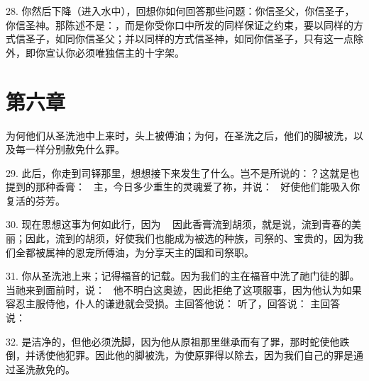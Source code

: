28. 你然后下降（进入水中），回想你如何回答那些问题：你信圣父，你信圣子，你信圣神。那陈述不是：，而是你受你口中所发的同样保证之约束，要以同样的方式信圣子，如同你信圣父；并以同样的方式信圣神，如同你信圣子，只有这一点除外，即你宣认你必须唯独信主的十字架。\par


\section{第六章}

为何他们从圣洗池中上来时，头上被傅油；为何，在圣洗之后，他们的脚被洗，以及每一样分别赦免什么罪。\par

29. 此后，你走到司铎那里，想想接下来发生了什么。岂不是所说的：？这就是也提到的那种香膏：~ 主，今日多少重生的灵魂爱了祢，并说：~ 好使他们能吸入你复活的芬芳。\par

30. 现在思想这事为何如此行，因为 ~ 因此香膏流到胡须，就是说，流到青春的美丽；因此，流到的胡须，好使我们也能成为被选的种族，司祭的、宝贵的，因为我们全都被属神的恩宠所傅油，为分享天主的国和司祭职。\par

31. 你从圣洗池上来；记得福音的记载。因为我们的主在福音中洗了祂门徒的脚。当祂来到面前时，说：~ 他不明白这奥迹，因此拒绝了这项服事，因为他认为如果容忍主服侍他，仆人的谦逊就会受损。主回答他说： 听了，回答说： 主回答说：~\par

32. 是洁净的，但他必须洗脚，因为他从原祖那里继承而有了罪，那时蛇使他跌倒，并诱使他犯罪。因此他的脚被洗，为使原罪得以除去，因为我们自己的罪是通过圣洗赦免的。\par

